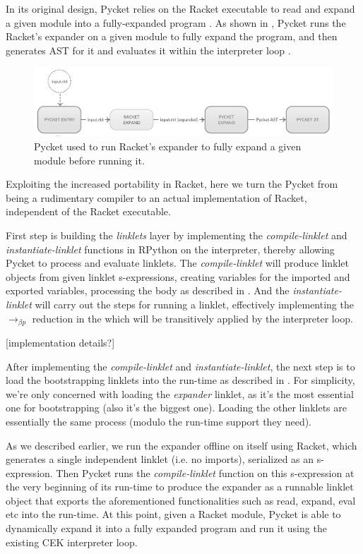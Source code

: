In its original design, Pycket relies on the Racket executable to read
and expand a given module into a fully-expanded program
\cite{samth:11}. As shown in , Pycket runs the
Racket's expander on a given module to fully expand the program, and
then generates AST for it and evaluates it within the interpreter
loop \cite{pycket15}.

\begin{figure}[h!]
  \centering
\includegraphics[scale=0.3]{img/old-pycket-grayscale}
\caption{Pycket used to run Racket's expander to fully expand a given module before running it.}
\label{fig:old-pycket}
\end{figure}

Exploiting the increased portability in Racket, here we turn the
Pycket from being a rudimentary compiler to an actual implementation
of Racket, independent of the Racket executable.

First step is building the \emph{linklets} layer by implementing the
\emph{compile-linklet} and \emph{instantiate-linklet} functions in
RPython on the interpreter, thereby allowing Pycket to process and
evaluate linklets. The \emph{compile-linklet} will produce linklet
objects from given linklet s-expressions, creating variables for the
imported and exported variables, processing the body as described in
. And the \emph{instantiate-linklet}
will carry out the steps for running a linklet, effectively
implementing the $\longrightarrow_{\beta p}$ reduction in the 
which will be transitively applied by the interpreter loop.

[implementation details?]

After implementing the \emph{compile-linklet} and
\emph{instantiate-linklet}, the next step is to load the bootstrapping
linklets into the run-time as described in
. For simplicity, we're only concerned
with loading the \emph{expander} linklet, as it's the most essential
one for bootstrapping (also it's the biggest one). Loading the other
linklets are essentially the same process (modulo the run-time support
they need).

As we described earlier, we run the expander offline on itself using
Racket, which generates a single independent linklet (i.e. no
imports), serialized as an s-expression. Then Pycket runs the
\emph{compile-linklet} function on this s-expression at the very
beginning of its run-time to produce the expander as a runnable
linklet object that exports the aforementioned functionalities such as
read, expand, eval etc into the run-time. At this point, given a
Racket module, Pycket is able to dynamically expand it into a fully
expanded program and run it using the existing CEK interpreter loop.

